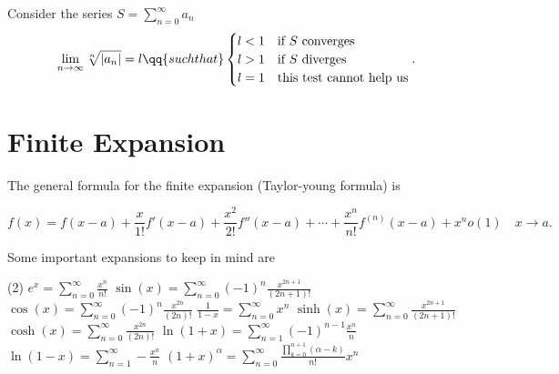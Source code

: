 \begin{theorem}
	Consider the series $S=\sum_{n=0}^{\infty} a_n$
	\[
		\lim_{n \to \infty}\sqrt[n]{|a_n|} = l\qq{such that} \begin{cases}l<1 & \text{if $S$ converges}         \\
			l>1 & \text{if $S$ diverges}          \\
			l=1 & \text{this test cannot help us} \\
		\end{cases}
		.\]
\end{theorem}
\section{Finite Expansion}
The general formula for the finite expansion (Taylor-young formula) is

\[
	f(x) = f(x-a)+ \frac{x}{1!}f'(x-a)+\frac{x^2}{2!}f''(x-a)+\cdots+\frac{x^n}{n!}f^{(n)}(x-a)+x^no(1) \quad x\to a
	.\]

Some important expansions to keep in mind are\\
\begin{fullpage}

	\begin{tasks}(2)
		\task $e^x=\sum_{n=0}^{\infty} \frac{x^n}{n!}$
		\task $\sin(x)=\sum_{n=0}^{\infty} (-1)^n \frac{x^{2n+1}}{(2n+1)!}$
		\task $\cos(x)=\sum_{n=0}^{\infty} (-1)^n \frac{x^{2n}}{(2n)!}$
		\task $\frac{1}{1-x}=\sum_{n=0}^{\infty} x^n$
		\task $\sinh(x)=\sum_{n=0}^{\infty} \frac{x^{2n+1}}{(2n+1)!}$
		\task $\cosh(x)=\sum_{n=0}^{\infty} \frac{x^{2n}}{(2n)!}$
		\task $\ln(1+x)=\sum_{n=1}^{\infty} (-1)^{n-1}\frac{x^n}{n}$
		\task $\ln(1-x)=\sum_{n=1}^{\infty} -\frac{x^n}{n}$
		\task $(1+x)^\alpha=\sum_{n=0}^{\infty} \frac{\prod_{k=0}^{n+1}(\alpha-k)  }{n!}x^n$
	\end{tasks}
\end{fullpage}
